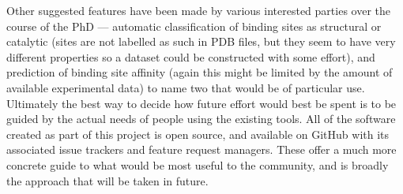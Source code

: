 Other suggested features have been made by various interested parties over the course of the PhD --- automatic classification of binding sites as structural or catalytic (sites are not labelled as such in PDB files, but they seem to have very different properties so a dataset could be constructed with some effort), and prediction of binding site affinity (again this might be limited by the amount of available experimental data) to name two that would be of particular use. Ultimately the best way to decide how future effort would best be spent is to be guided by the actual needs of people using the existing tools. All of the software created as part of this project is open source, and available on GitHub with its associated issue trackers and feature request managers. These offer a much more concrete guide to what would be most useful to the community, and is broadly the approach that will be taken in future.